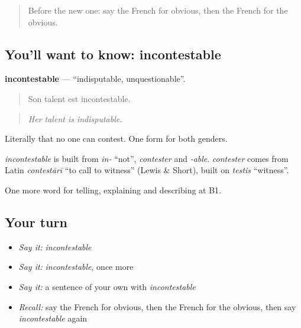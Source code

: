 \label{lesson:FR-C339-incontestable}



\begin{quote}
Before the new one: say the French for obvious, then the French for the obvious.
\end{quote}

\subsection*{You'll want to know: incontestable}
\textbf{incontestable} — \textquotedblleft{}indisputable, unquestionable\textquotedblright{}.

\begin{quote}
Son talent est incontestable.
\end{quote}

\begin{quote}
\emph{Her talent is indisputable.}
\end{quote}

Literally that no one can contest. One form for both genders.

\begin{cousinweb}
\emph{incontestable} is built from \emph{in-} \textquotedblleft{}not\textquotedblright{}, \emph{contester} and \emph{-able}. \emph{contester} comes from Latin \emph{contestārī} \textquotedblleft{}to call to witness\textquotedblright{} (Lewis \& Short), built on \emph{testis} \textquotedblleft{}witness\textquotedblright{}.
\end{cousinweb}

\begin{grammarlens}[title={What you've built}]
One more word for telling, explaining and describing at B1.
\end{grammarlens}

\subsection*{Your turn}
\begin{itemize}
\raggedright
  \item \emph{Say it:} \emph{incontestable}
  \item \emph{Say it:} \emph{incontestable}, once more
  \item \emph{Say it:} a sentence of your own with \emph{incontestable}
  \item \emph{Recall:} say the French for obvious, then the French for the obvious, then say \emph{incontestable} again
\end{itemize}

